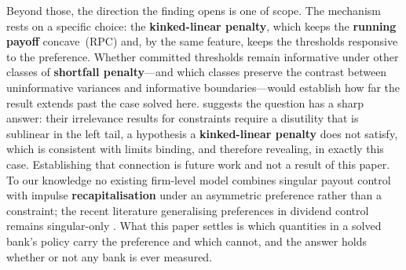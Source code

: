 \documentclass[11pt]{article}
\begin{document}
Beyond those, the direction the finding opens is one of scope. The
mechanism rests on a specific choice: the \textbf{kinked-linear penalty}, which
keeps the \textbf{running payoff} concave~(RPC) and, by the same feature, keeps the
thresholds responsive to the preference. Whether committed thresholds
remain informative under other classes of \textbf{shortfall penalty}---and which
classes preserve the contrast between uninformative variances and
informative boundaries---would establish how far the result extends past
the case solved here. \citet{armstrong2019} suggests the question has a
sharp answer: their irrelevance results for constraints require a
disutility that is sublinear in the left tail, a hypothesis a
\textbf{kinked-linear penalty} does not satisfy, which is consistent with limits
binding, and therefore revealing, in exactly this case. Establishing that
connection is future work and not a result of this paper. To our knowledge
no existing firm-level model combines singular payout control with impulse
\textbf{recapitalisation} under an asymmetric preference rather than a constraint;
the recent literature generalising preferences in dividend control remains
singular-only \citep{chen2026,cao2026}. What this paper settles is which
quantities in a solved bank's policy carry the preference and which
cannot, and the answer holds whether or not any bank is ever measured.



\end{document}
